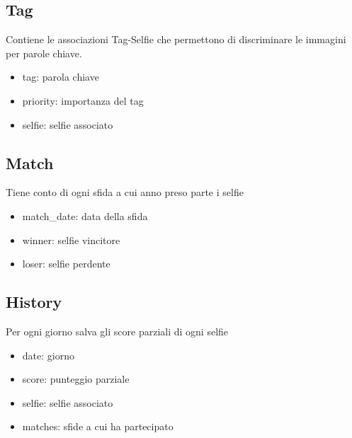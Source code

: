 \documentclass{article}
\begin{document}
\subsection{Tag}
Contiene le associazioni Tag-Selfie che permettono di discriminare le immagini per parole chiave.
\begin{itemize}
\item tag: parola chiave
\item priority: importanza del tag
\item selfie: selfie associato
\end{itemize}

\subsection{Match}
Tiene conto di ogni sfida a cui anno preso parte i selfie
\begin{itemize}
\item match\_date: data della sfida
\item winner: selfie vincitore
\item loser: selfie perdente
\end{itemize}

\subsection{History}
Per ogni giorno salva gli score parziali di ogni selfie
\begin{itemize}
\item date: giorno
\item score: punteggio parziale
\item selfie: selfie associato
\item matches: sfide a cui ha partecipato
\end{itemize}
\end{document}
